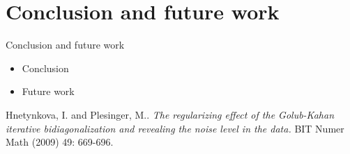 \documentclass{beamer}
\begin{document}
\section{Conclusion and future work}
\begin{frame}{Conclusion and future work}
  \begin{itemize}
    \item Conclusion

    \item Future work
  \end{itemize}
\end{frame}

\begin{thebibliography}{1}
    Hnetynkova, I. and Plesinger, M.. 
    \emph{The regularizing effect of the Golub-Kahan iterative bidiagonalization 
      and revealing the noise level in the data.}
      BIT Numer Math (2009) 49: 669-696.
\end{thebibliography}
\end{document}
